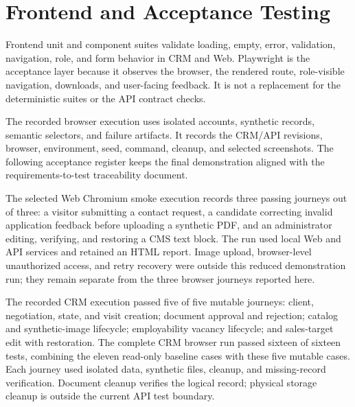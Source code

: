 \documentclass[letterpaper%
, oneside%
, 12pt%
, memoireprojet%
, english%
,creativecommons,hyperref, withAlgo2e %
]{thETS}
\begin{document}
\FloatBarrier

\section{Frontend and Acceptance Testing}
Frontend unit and component suites validate loading, empty, error, validation, navigation, role, and
form behavior in CRM and Web. Playwright is the acceptance layer because it observes the browser,
the rendered route, role-visible navigation, downloads, and user-facing feedback. It is not a
replacement for the deterministic suites or the API contract checks.

The recorded browser execution uses isolated accounts, synthetic records, semantic selectors, and
failure artifacts. It records the CRM/API revisions, browser, environment, seed, command, cleanup,
and selected screenshots. The following acceptance register keeps the final demonstration aligned
with the requirements-to-test traceability document.

The selected Web Chromium smoke execution records three passing journeys out of three: a visitor
submitting a contact request, a candidate correcting invalid application feedback before uploading
a synthetic PDF, and an administrator editing, verifying, and restoring a CMS text block. The run
used local Web and API services and retained an HTML report. Image upload, browser-level
unauthorized access, and retry recovery were outside this reduced demonstration run; they remain
separate from the three browser journeys reported here.

The recorded CRM execution passed five of five mutable journeys: client, negotiation, state, and
visit creation; document approval and rejection; catalog and synthetic-image lifecycle;
employability vacancy lifecycle; and sales-target edit with restoration. The complete CRM browser
run passed sixteen of sixteen tests, combining the eleven read-only baseline cases with these five
mutable cases. Each journey used isolated data, synthetic files, cleanup, and missing-record
verification. Document cleanup verifies the logical record; physical storage cleanup is outside the
current API test boundary.
\end{document}
